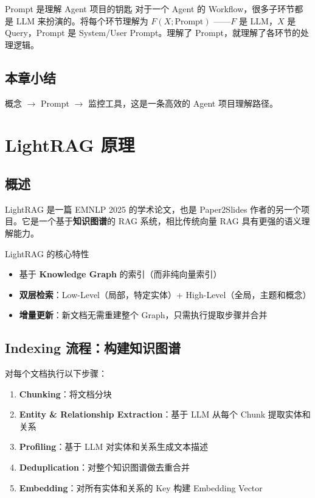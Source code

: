 \documentclass[a4paper]{article}
\begin{document}
\begin{knowledgebox}{Prompt 是理解 Agent 项目的钥匙}
对于一个 Agent 的 Workflow，很多子环节都是 LLM 来扮演的。将每个环节理解为 $F(X; \text{Prompt})$ ——$F$ 是 LLM，$X$ 是 Query，Prompt 是 System/User Prompt。理解了 Prompt，就理解了各环节的处理逻辑。
\end{knowledgebox}

\subsection{本章小结}

概念 $\rightarrow$ Prompt $\rightarrow$ 监控工具，这是一条高效的 Agent 项目理解路径。

\section{LightRAG 原理}

\subsection{概述}

LightRAG 是一篇 EMNLP 2025 的学术论文，也是 Paper2Slides 作者的另一个项目。它是一个基于\textbf{知识图谱}的 RAG 系统，相比传统向量 RAG 具有更强的语义理解能力。

\begin{importantbox}{LightRAG 的核心特性}
\begin{itemize}
    \item 基于 \textbf{Knowledge Graph} 的索引（而非纯向量索引）
    \item \textbf{双层检索}：Low-Level（局部，特定实体）+ High-Level（全局，主题和概念）
    \item \textbf{增量更新}：新文档无需重建整个 Graph，只需执行提取步骤并合并
\end{itemize}
\end{importantbox}

\subsection{Indexing 流程：构建知识图谱}

对每个文档执行以下步骤：

\begin{enumerate}
    \item \textbf{Chunking}：将文档分块
    \item \textbf{Entity \& Relationship Extraction}：基于 LLM 从每个 Chunk 提取实体和关系
    \item \textbf{Profiling}：基于 LLM 对实体和关系生成文本描述
    \item \textbf{Deduplication}：对整个知识图谱做去重合并
    \item \textbf{Embedding}：对所有实体和关系的 Key 构建 Embedding Vector
\end{enumerate}
\end{document}
